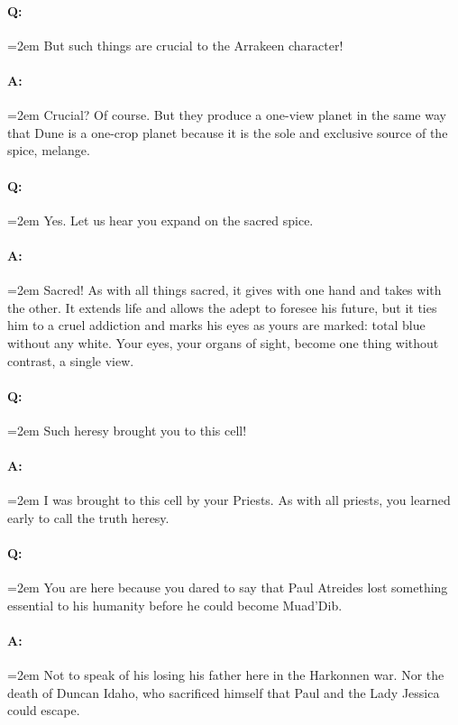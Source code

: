 \documentclass[a4paper, 12pt, oldfontcommands, final]{memoir}
\begin{document}
\paragraph{Q:} \hangindent=2em But such things are crucial to the Arrakeen character!
\paragraph{A:} \hangindent=2em Crucial? Of course. But they produce a one-view planet in the same way that Dune is a one-crop planet because it is the sole and exclusive source of the spice, melange.
\paragraph{Q:} \hangindent=2em Yes. Let us hear you expand on the sacred spice.
\paragraph{A:} \hangindent=2em Sacred! As with all things sacred, it gives with one hand and takes with the other. It extends life and allows the adept to foresee his future, but it ties him to a cruel addiction and marks his eyes as yours are marked: total blue without any white. Your eyes, your organs of sight, become one thing without contrast, a single view.
\paragraph{Q:} \hangindent=2em Such heresy brought you to this cell!
\paragraph{A:} \hangindent=2em I was brought to this cell by your Priests. As with all priests, you learned early to call the truth heresy.
\paragraph{Q:} \hangindent=2em You are here because you dared to say that Paul Atreides lost something essential to his humanity before he could become Muad'Dib.
\paragraph{A:} \hangindent=2em Not to speak of his losing his father here in the Harkonnen war. Nor the death of Duncan Idaho, who sacrificed himself that Paul and the Lady Jessica could escape.
\end{document}
